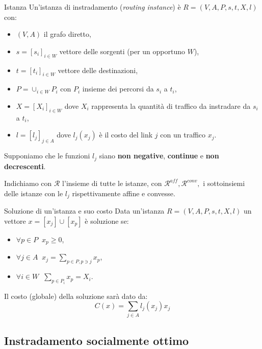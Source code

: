 \documentclass{beamer}
\theoremstyle{plain}
\theoremstyle{definition}
\theoremstyle{remark}
\newcommand{\bra}[1]{\left[#1\right]}
\begin{document}
\begin{frame}{Istanza}
  Un'istanza di instradamento (\textit{routing instance}) è
  $R=(V,A,P,s,t,X,l)$ con:
  \begin{itemize}
  \item $(V,A)$ il grafo diretto,
  \item $s = \bra{s_i}_{i\in W}$ vettore delle sorgenti (per un opportuno $W$),
  \item $t = \bra{t_i}_{i\in W}$ vettore delle destinazioni,
  \item $P = \cup _{i\in W} P_i$ con $P_i$ insieme dei
    percorsi da $s_i$ a $t_i$,
  \item $X = \bra{X_i}_{i\in W}$ dove $X_i$ rappresenta la quantità di
    traffico da instradare da $s_i$ a $t_i$,
  \item $l = \bra{l_j}_{j\in A}$ dove $l_j(x_j)$ è il costo del link
    $j$ con un traffico $x_j$.
  \end{itemize}
  
  Supponiamo che le funzioni $l_j$ siano \textbf{non negative},
  \textbf{continue} e \textbf{non decrescenti}.

  Indichiamo con $\mathcal{R}$ l'insieme di tutte le istanze, con
  $\mathcal{R}^{aff},\mathcal{R}^{conv},$ i sottoinsiemi delle istanze con
  le $l_j$ rispettivamente affine e convesse.
\end{frame}

\begin{frame}{Soluzione di un'istanza e suo costo}
  Data un'istanza $R=(V,A,P,s,t,X,l)$ un vettore
  $x = \bra{x_j} \cup \bra{x_p}$ è soluzione se:
  \begin{itemize}
  \item $\displaystyle \forall p\in P\;\; x_p \ge 0$,
  \item $\displaystyle \forall j\in A\;\; x_j = \sum_{p\in P,p\ni j} x_p$,
  \item $\displaystyle \forall i\in W\;\; \sum_{p\in P_i} x_p = X_i$.
  \end{itemize}
  
  Il costo (globale) della soluzione sarà dato da:
  \[ C(x) = \sum_{j\in A} l_j(x_j)x_j \]
\end{frame}

\subsection{Instradamento socialmente ottimo}
\end{document}
